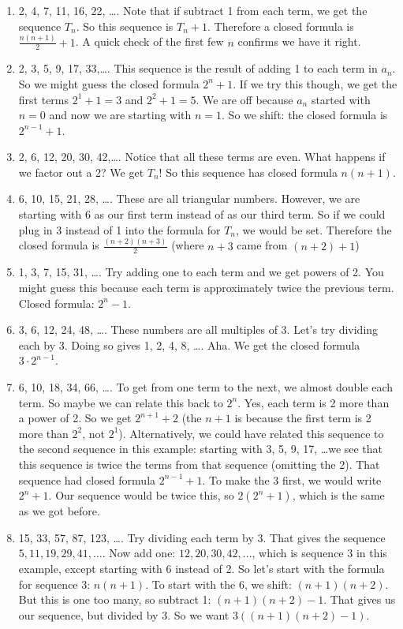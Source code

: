 \documentclass[12pt]{article}
\begin{document}
\begin{example}
\begin{solution}
    \begin{enumerate}
    \item 2, 4, 7, 11, 16, 22, \ldots. Note that if subtract 1 from each term, we get the sequence $T_n$.  So this sequence is $T_n + 1$.  Therefore a closed formula is $\frac{n(n+1)}{2} + 1$.  A quick check of the first few $n$ confirms we have it right.
    \item 2, 3, 5, 9, 17, 33,\ldots. This sequence is the result of adding 1 to each term in $a_n$.  So we might guess the closed formula $2^n + 1$.  If we try this though, we get the first terms $2^1 + 1 = 3$ and $2^2 + 1 = 5$.  We are off because $a_n$ started with $n = 0$ and now we are starting with $n = 1$.  So we shift: the closed formula is $2^{n-1} + 1$.
    \item 2, 6, 12, 20, 30, 42,\ldots. Notice that all these terms are even.  What happens if we factor out a 2?  We get $T_n$!  So this sequence has closed formula $n(n+1)$.
    \item 6, 10, 15, 21, 28, \ldots. These are all triangular numbers.  However, we are starting with 6 as our first term instead of as our third term.  So if we could plug in 3 instead of 1 into the formula for $T_n$, we would be set.  Therefore the closed formula is $\frac{(n+2)(n+3)}{2}$ (where $n+3$ came from $(n+2)+1$)  
    \item 1, 3, 7, 15, 31, \ldots. Try adding one to each term and we get powers of 2.  You might guess this because each term is approximately twice the previous term.  Closed formula: $2^{n} - 1$.
    \item 3, 6, 12, 24, 48, \ldots. These numbers are all multiples of 3.  Let's try dividing each by 3.  Doing so gives 1, 2, 4, 8, \ldots.  Aha.  We get the closed formula $3\cdot 2^{n-1}$.  
    \item 6, 10, 18, 34, 66, \ldots. To get from one term to the next, we almost double each term.  So maybe we can relate this back to $2^n$. Yes, each term is 2 more than a power of 2.  So we get $2^{n+1} + 2$ (the $n+1$ is because the first term is 2 more than $2^2$, not $2^1$).  Alternatively, we could have related this sequence to the second sequence in this example: starting with 3, 5, 9, 17, \ldots we see that this sequence is twice the terms from that sequence (omitting the 2).  That sequence had closed formula $2^{n-1} + 1$.  To make the 3 first, we would write $2^{n} + 1$.  Our sequence would be twice this, so $2(2^n + 1)$, which is the same as we got before.
    \item 15, 33, 57, 87, 123, \ldots. Try dividing each term by 3.  That gives the sequence $5, 11, 19, 29, 41,\ldots$.  Now add one: $12, 20, 30, 42, \ldots$, which is sequence 3 in this example, except starting with 6 instead of 2.  So let's start with the formula for sequence 3: $n(n+1)$.  To start with the 6, we shift: $(n+1)(n+2)$.  But this is one too many, so subtract 1: $(n+1)(n+2) - 1$.  That gives us our sequence, but divided by 3.  So we want $3((n+1)(n+2) - 1)$. 
  \end{enumerate}
\end{solution}

\end{example}
\end{document}
